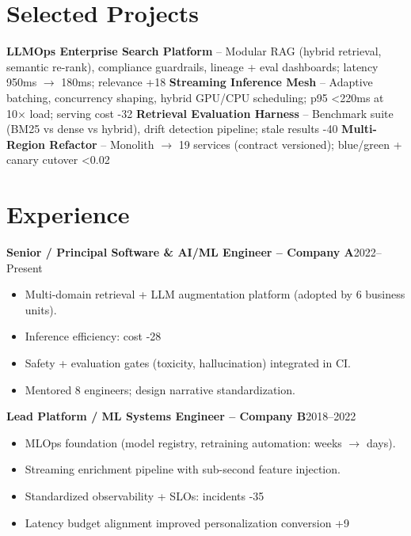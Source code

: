 \documentclass[11pt,a4paper]{article}
\begin{document}
\section*{Selected Projects}
\textbf{LLMOps Enterprise Search Platform} -- Modular RAG (hybrid retrieval, semantic re-rank), compliance guardrails, lineage + eval dashboards; latency 950ms $\rightarrow$ 180ms; relevance +18%
\textbf{Streaming Inference Mesh} -- Adaptive batching, concurrency shaping, hybrid GPU/CPU scheduling; p95 <220ms at 10× load; serving cost -32%
\textbf{Retrieval Evaluation Harness} -- Benchmark suite (BM25 vs dense vs hybrid), drift detection pipeline; stale results -40%
\textbf{Multi-Region Refactor} -- Monolith $\rightarrow$ 19 services (contract versioned); blue/green + canary cutover <0.02%

\section*{Experience}
\textbf{Senior / Principal Software \& AI/ML Engineer -- Company A}\hfill 2022--Present\\
\begin{itemize}
  \item Multi-domain retrieval + LLM augmentation platform (adopted by 6 business units).
  \item Inference efficiency: cost -28%
  \item Safety + evaluation gates (toxicity, hallucination) integrated in CI.
  \item Mentored 8 engineers; design narrative standardization.
\end{itemize}

\textbf{Lead Platform / ML Systems Engineer -- Company B}\hfill 2018--2022\\
\begin{itemize}
  \item MLOps foundation (model registry, retraining automation: weeks $\rightarrow$ days).
  \item Streaming enrichment pipeline with sub-second feature injection.
  \item Standardized observability + SLOs: incidents -35%
  \item Latency budget alignment improved personalization conversion +9%
\end{itemize}
\end{document}
